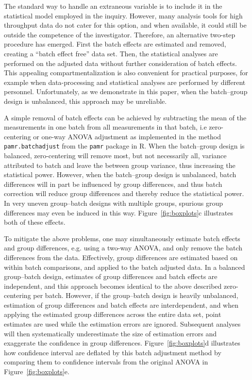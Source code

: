 \documentclass{bio}
\begin{document}
The standard way to handle an extraneous variable is to include it in the statistical model employed in the inquiry. However, many analysis tools for high throughput data do not cater for this option, and when available, it could still be outside the competence of the investigator. Therefore, an alternative two-step procedure has emerged. First the batch effects are estimated and removed, creating a ``batch effect free'' data set. Then, the statistical analyses are performed on the adjusted data without further consideration of batch effects. This appealing compartmentalization is also convenient for practical purposes, for example when data-processing and statistical analyses are performed by different personnel. Unfortunately, as we demonstrate in this paper, when the batch--group design is unbalanced, this approach may be unreliable.

A simple removal of batch effects can be achieved by subtracting the mean of the measurements in one batch from all measurements in that batch, i.e zero-centering or one-way ANOVA adjustment as implemented in the method \texttt{pamr.batchadjust} from the \texttt{pamr} package in R. When the batch--group design is balanced, zero-centering will remove most, but not necessarily all, variance attributed to batch and leave the between group variance, thus increasing the statistical power. However, when the batch--group design is unbalanced, batch differences will in part be influenced by group differences, and thus batch correction will reduce group differences and thereby reduce the statistical power. In very uneven group--batch designs with multiple groups, spurious group differences may even be induced in this way. Figure~\ref{fig:boxplots}c illustrates both of these effects.

To mitigate the above problems, one may simultaneously estimate batch effects and group differences, e.g. using a two-way ANOVA, and only remove the batch differences from the data. Effectively, group differences are estimated based on within batch comparisons, and applied to the batch adjusted data. In a balanced group--batch design, estimates of group differences and batch effects are independent, and this approach becomes identical to the above described zero-centering per batch. However, if the group--batch design is heavily unbalanced, estimation of group differences and batch effects are interdependent, and when applying the estimated group differences across the entire data set, point estimates are used while the estimation errors are ignored. Subsequent analyses will then systematically underestimate the size of estimation errors and exaggerate the confidence in group differences. Figure~\ref{fig:boxplots}d illustrates how confidence interval are deflated by this batch adjustment method by comparing them to confidence intervals from the original ANOVA in Figure~\ref{fig:boxplots}e.
\end{document}
